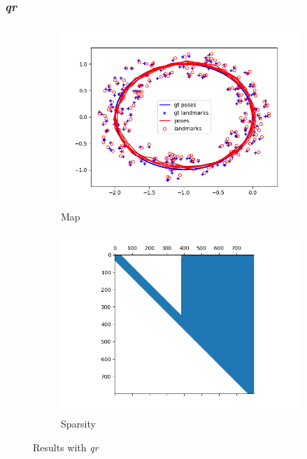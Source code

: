 \documentclass[12pt, a4paper]{article}
\begin{document}
\subsubsection{\textit{qr}}
\begin{figure}[H]
  \centering
  \begin{subfigure}[b]{0.45\textwidth}
    \includegraphics[width=\textwidth]{./results/linear/qr_2d_linear_loop_map.png}
    \caption{Map}
  \end{subfigure}
  \hfill
  \begin{subfigure}[b]{0.45\textwidth}
    \includegraphics[width=\textwidth]{./results/linear/qr_2d_linear_loop_sparsity.png}
    \caption{Sparsity}
  \end{subfigure}
  \caption{Results with \textit{qr}}
\end{figure}
\end{document}
